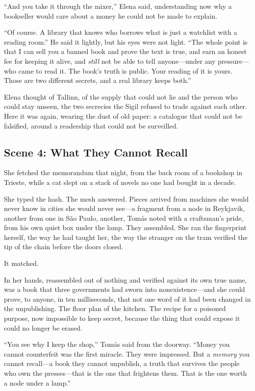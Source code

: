 \documentclass[12pt,letterpaper]{book}
\begin{document}
``And you take it through the mixer,'' Elena said, understanding now why a
bookseller would care about a money he could not be made to explain.

``Of course. A library that knows who borrows what is just a watchlist with a
reading room.'' He said it lightly, but his eyes were not light. ``The whole point
is that I can sell you a banned book and prove the text is true, and earn an honest
fee for keeping it alive, and \emph{still} not be able to tell anyone---under any
pressure---who came to read it. The book's truth is public. Your reading of it is
yours. Those are two different secrets, and a real library keeps both.''

Elena thought of Tallinn, of the supply that could not lie and the person who could
stay unseen, the two secrecies the Sigil refused to trade against each other. Here
it was again, wearing the dust of old paper: a catalogue that could not be
falsified, around a readership that could not be surveilled.

\hypertarget{scene-4-what-they-cannot-recall}{%
\subsection{Scene 4: What They Cannot
Recall}\label{scene-4-what-they-cannot-recall}}

She fetched the memorandum that night, from the back room of a bookshop in
Trieste, while a cat slept on a stack of novels no one had bought in a decade.

She typed the hash. The mesh answered. Pieces arrived from machines she would never
know in cities she would never see---a fragment from a node in Reykjavik, another
from one in São Paulo, another, Tomás noted with a craftsman's pride, from his own
quiet box under the lamp. They assembled. She ran the fingerprint herself, the way
he had taught her, the way the stranger on the tram verified the tip of the chain
before the doors closed.

It matched.

In her hands, reassembled out of nothing and verified against its own true name,
was a book that three governments had sworn into nonexistence---and she could prove,
to anyone, in ten milliseconds, that not one word of it had been changed in the
unpublishing. The floor plan of the kitchen. The recipe for a poisoned purpose,
now impossible to keep secret, because the thing that could expose it could no
longer be erased.

``You see why I keep the shop,'' Tomás said from the doorway. ``Money you cannot
counterfeit was the first miracle. They were impressed. But a \emph{memory} you
cannot recall---a book they cannot unpublish, a truth that survives the people who
own the presses---that is the one that frightens them. That is the one worth a
node under a lamp.''
\end{document}
